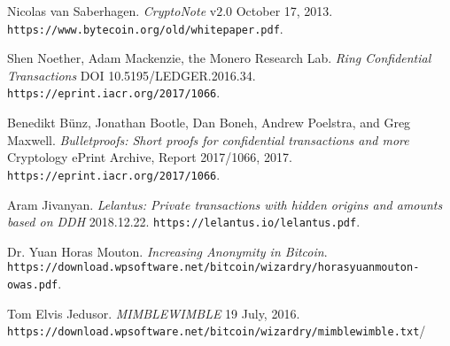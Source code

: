 \documentclass{article}
\begin{document}
\newpage
\begin{thebibliography}{6}

  Nicolas van Saberhagen.
  \emph{CryptoNote} v$2.0$ October 17, 2013.
  \texttt{https://www.bytecoin.org/old/whitepaper.pdf}.

  Shen Noether, Adam Mackenzie, the Monero Research Lab.
  \emph{Ring Confidential Transactions} DOI 10.5195/LEDGER.2016.34.
  \texttt{https://eprint.iacr.org/2017/1066}.

  Benedikt Bünz, Jonathan Bootle, Dan Boneh, Andrew Poelstra, and Greg Maxwell.
  \emph{Bulletproofs: Short proofs for confidential transactions and more} Cryptology ePrint Archive, Report 2017/1066, 2017.
  \texttt{https://eprint.iacr.org/2017/1066}.

  Aram Jivanyan.
  \emph{Lelantus: Private transactions with hidden origins and amounts based on DDH} 2018.12.22.
  \texttt{https://lelantus.io/lelantus.pdf}.

  Dr. Yuan Horas Mouton.
  \emph{Increasing Anonymity in Bitcoin}.
  \texttt{https://download.wpsoftware.net/bitcoin/wizardry/horasyuanmouton-owas.pdf}.

  Tom Elvis Jedusor.
  \emph{MIMBLEWIMBLE} 19 July, 2016.
  \texttt{https://download.wpsoftware.net/bitcoin/wizardry/mimblewimble.txt}/

\end{thebibliography}
\end{document}
